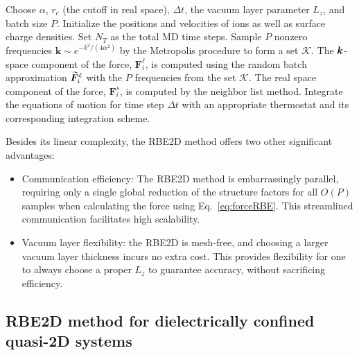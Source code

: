 \begin{algorithm}[ht]
 \caption{(RBE2D accelerated molecular dynamics for quasi-2D systems)}\label{Alg::1}
 \begin{algorithmic}[1]
  \State Choose $\alpha$, $r_c$ (the cutoff in real space), $\Delta t$, the vacuum layer parameter $L_z$, and batch size $P$. Initialize the positions and velocities of ions as well as surface charge densities. Set $N_T$ as the total MD time steps.
  \State Sample $P$ nonzero frequencies $\bm{k}\sim e^{-k^2/(4\alpha^2)}$ by the Metropolis procedure to form a set $\mathcal{K}$.
  \State The $\boldsymbol{k}$-space component of the force, $\bm{F}_i^{\ell}$, is computed using the random batch approximation $\widetilde{\boldsymbol{F}}_i^{\ell}$ with the $P$ frequencies from the set $\mathcal{K}$.
  \State The real space component of the force, $\bm{F}_i^{s}$, is computed by the neighbor list method. %
  \State Integrate the equations of motion for time step $\Delta t$ with an appropriate thermostat and its corresponding integration scheme. %
  
  \EndFor
 \end{algorithmic}
\end{algorithm}
Besides its linear complexity, the RBE2D method offers two other significant advantages:
\begin{itemize}
    \item  {Communication efficiency: The RBE2D method is embarrassingly parallel, requiring only a single global reduction of the structure factors for all $O(P)$ samples when calculating the force using Eq.~\eqref{eq:forceRBE}.} This streamlined communication facilitates high scalability. 

    \item Vacuum layer flexibility: the RBE2D is mesh-free, and choosing a larger vacuum layer thickness incurs no extra cost. This provides flexibility for one to always choose a proper $L_z$ to guarantee accuracy, without sacrificing efficiency.
\end{itemize}

\subsection{RBE2D method for dielectrically confined quasi-2D systems} \label{subsec::IBCELCDielectric}

